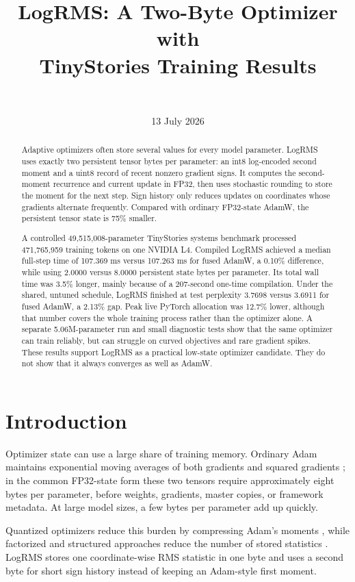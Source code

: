 \documentclass[10pt,twocolumn]{article}
\title{\textbf{LogRMS: A Two-Byte Optimizer with\\
TinyStories Training Results}}
\author{\paperauthor\\
\small \paperaffiliation}
\date{13 July 2026}
\begin{document}
\maketitle

\begin{abstract}
Adaptive optimizers often store several values for every model parameter.
LogRMS uses exactly two persistent tensor bytes per parameter: an int8
log-encoded second moment and a uint8 record of recent nonzero gradient signs.
It computes the second-moment recurrence and current update in FP32, then uses
stochastic rounding to store the moment for the next step. Sign history only
reduces updates on coordinates whose gradients alternate frequently. Compared
with ordinary FP32-state AdamW, the persistent tensor state is 75\% smaller.

A controlled 49,515,008-parameter TinyStories systems benchmark processed
471,765,959 training tokens on one NVIDIA L4. Compiled LogRMS achieved a median
full-step time of 107.369 ms versus 107.263 ms for fused AdamW, a 0.10\%
difference, while using 2.0000 versus 8.0000 persistent state bytes per
parameter. Its total wall time was 3.5\% longer, mainly because of a
207-second one-time compilation. Under the shared, untuned schedule, LogRMS
finished at test perplexity 3.7698 versus 3.6911 for fused AdamW, a 2.13\% gap.
Peak live PyTorch allocation was 12.7\% lower, although that number covers the
whole training process rather than the optimizer alone. A separate
5.06M-parameter run and small diagnostic tests show that the same optimizer can
train reliably, but can struggle on curved objectives and rare gradient spikes.
These results support LogRMS as a practical low-state optimizer candidate. They
do not show that it always converges as well as AdamW.
\end{abstract}

\section{Introduction}

Optimizer state can use a large share of training memory.
Ordinary Adam maintains exponential moving averages of both gradients and
squared gradients \cite{kingma2014adam}; in the common FP32-state form these two
tensors require approximately eight bytes per parameter, before weights,
gradients, master copies, or framework metadata. At large model sizes, a few
bytes per parameter add up quickly.

Quantized optimizers reduce this burden by compressing Adam's moments
\cite{dettmers20218bit}, while factorized and structured approaches reduce the
number of stored statistics \cite{shazeer2018adafactor,anil2019sm3}. LogRMS
stores one coordinate-wise RMS statistic in one byte and uses a second byte for
short sign history instead of keeping an Adam-style first moment.
\end{document}
